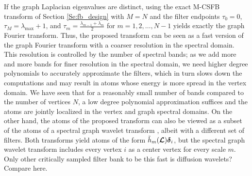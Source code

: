 \documentclass[journal, 10pt]{IEEEtran}
\begin{document}
If the graph Laplacian eigenvalues are distinct, using the exact M-CSFB transform of Section \ref{Se:fb_design} with $M=N$ and the filter endpoints $\tau_0=0$, $\tau_M = \lambda_{\max}+1$, and $\tau_m=\frac{\lambda_{m-1}+\lambda_m}{2}$ for $m=1,2,\ldots,N-1$ yields exactly the graph Fourier transform. Thus, the proposed transform can be seen as a fast version of the graph Fourier transform with a coarser resolution in the spectral domain. This resolution is controlled by the number of spectral bands; as we add more and more bands for finer resolution in the spectral domain, we need higher degree polynomials to accurately approximate the filters, which in turn slows down the computations and may result in atoms whose energy is more spread in the vertex domain. We have seen that for a reasonably small number of bands compared to the number of vertices $N$, a low degree polynomial approximation suffices and the atoms are jointly localized in the vertex and graph spectral domains. On the other hand, the atoms of the proposed transform can also be viewed as a subset of the atoms of a spectral graph wavelet transform  \cite{hammond2011wavelets}, albeit with a different set of filters. Both transforms yield atoms of the form $\tilde{h}_m(\boldsymbol{\mathcal{L}}){\boldsymbol \delta}_i$, but the spectral graph wavelet transform includes every vertex $i$ as a center vertex for every scale $m$. {\color{red} Only other critically sampled filter bank to be this fast is diffusion wavelets? Compare here.}

\end{document}
